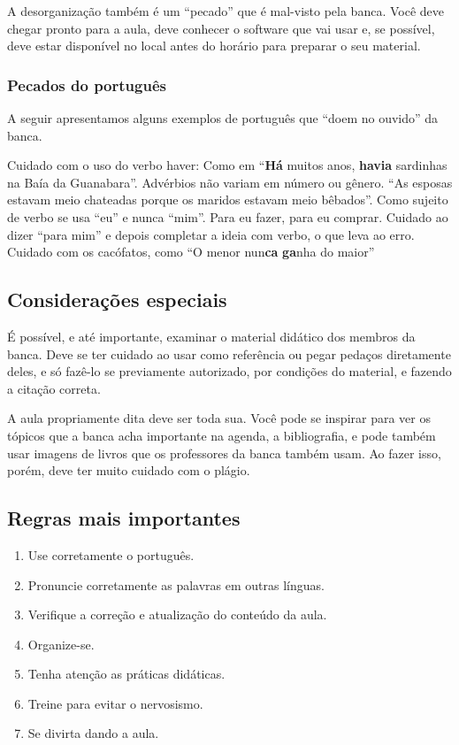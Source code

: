\documentclass{article}
\begin{document}
A desorganização também é um ``pecado'' que é mal-visto pela banca. Você deve chegar pronto para a aula, deve conhecer o software que vai usar e, se possível, deve estar disponível no local antes do horário para preparar o seu material.





\subsubsection{Pecados do português}

A seguir apresentamos alguns exemplos de português que ``doem no ouvido'' da banca.
\begin{outline}
\1 Cuidado com o uso do verbo haver:
\2 Como em ``\textbf{Há} muitos anos, \textbf{havia} sardinhas na Baía da Guanabara''.
\1 Advérbios não variam em número ou gênero.
\2 ``As esposas estavam meio chateadas porque os maridos estavam meio bêbados''.
\1 Como sujeito de verbo se usa ``eu'' e nunca ``mim''. Para eu fazer, para eu comprar. Cuidado ao dizer ``para mim'' e depois  completar a ideia com verbo, o que leva ao erro.
\1 Cuidado com os cacófatos, como ``O menor nun\textbf{ca} \textbf{ga}nha do maior''
\end{outline}

\subsection{Considerações especiais}

É possível, e até importante,  examinar o material didático dos membros da banca. Deve se ter cuidado ao usar como referência ou pegar pedaços diretamente deles, e só fazê-lo se previamente autorizado, por condições do material, e fazendo a citação correta.

A aula propriamente dita deve ser toda sua. Você pode se inspirar para ver os tópicos que a banca acha importante na agenda, a bibliografia, e pode também usar imagens de livros que os professores da banca também usam. Ao fazer isso, porém, deve ter muito cuidado com o plágio.

\subsection{Regras mais importantes}

\begin{enumerate}
\item Use corretamente o português.
\item Pronuncie corretamente as palavras em outras línguas.
\item Verifique a correção e atualização do conteúdo da aula.
\item Organize-se.
\item Tenha atenção as práticas didáticas.
\item Treine para evitar o nervosismo.
\item Se divirta dando a aula.
\end{enumerate}
\end{document}
